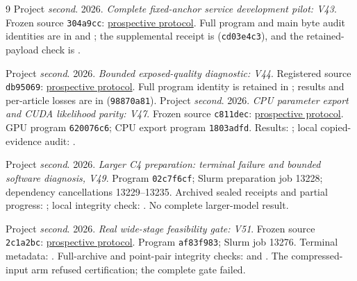 \documentclass[10pt,twocolumn,letterpaper]{article}
\begin{document}
\begin{thebibliography}{9}
Project \emph{second}. 2026. \emph{Complete fixed-anchor service development
pilot: V43}. Frozen source \texttt{304a9cc}:
\href{https://github.com/priyankjairaj100/second/blob/304a9cc73b3c263032f3ef6a02487b4d2df40fbe/research_v43/PROTOCOL.txt}{prospective protocol}.
Full program and main byte audit identities are in
 and
;
the supplemental receipt is
(\texttt{cd03e4c3}), and the retained-payload check is
.

Project \emph{second}. 2026. \emph{Bounded exposed-quality diagnostic: V44}.
Registered source \texttt{db95069}:
\href{https://github.com/priyankjairaj100/second/blob/db95069b2c3484ac615052fb1c1a711c8c773c2d/research_v44/PROTOCOL.txt}{prospective protocol}.
Full program identity is retained in
; results and
per-article losses are in
(\texttt{98870a81}).
Project \emph{second}. 2026. \emph{CPU parameter export and CUDA likelihood parity: V47}.
Frozen source \texttt{c811dec}:
\href{https://github.com/priyankjairaj100/second/blob/c811dec/research_v47/PROTOCOL.txt}{prospective protocol}.
GPU program \texttt{620076c6}; CPU export program \texttt{1803adfd}.
Results: ;
local copied-evidence audit: .

Project \emph{second}. 2026. \emph{Larger C4 preparation: terminal failure and
bounded software diagnosis, V49}.
Program \texttt{02c7f6cf}; Slurm preparation job 13228; dependency cancellations
13229--13235. Archived sealed receipts and partial progress:
; local integrity check:
. No complete larger-model result.

Project \emph{second}. 2026. \emph{Real wide-stage feasibility gate: V51}.
Frozen source \texttt{2c1a2bc}:
\href{https://github.com/priyankjairaj100/second/blob/2c1a2bc699e4633bdab7243bb9e042be2f884c83/research_v51/PROTOCOL.txt}{prospective protocol}.
Program \texttt{af83f983}; Slurm job 13276.
Terminal metadata: .
Full-archive and point-pair integrity checks:
 and
.
The compressed-input arm refused certification; the complete gate failed.


\end{thebibliography}
\end{document}
